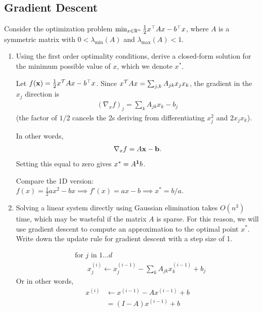 \newpage
\subsection{Gradient Descent}
Consider the optimization problem $\min_{x \in \mathbb{R}^n} \frac{1}{2} x^{\top} Ax - b^{\top}x$, where $A$ is a symmetric matrix with $0 < \lambda_{\min}(A)$ and $\lambda_{\max} (A) < 1$.
\begin{enumerate}[label=(\alph*)]
\item Using the first order optimality conditions, derive a closed-form
  solution for the minimum possible value of $x$, which we denote $x^*$.
  \begin{mdframed}
    Let $f(\mathbf x) = \frac{1}{2} x^\mathcal T Ax - b^{\top}x$. Since
    $x^\mathcal T Ax = \sum_{j,k}A_{jk}x_jx_k$, the gradient in the $x_j$ direction is
    \begin{align*}
      (\nabla_x f)_j = \sum_k A_{jk} x_k - b_j
    \end{align*}
    (the factor of $1/2$ cancels the 2s deriving from differentiating $x_j^2$
    and $2x_jx_k$).

    In other words,
    \begin{align*}
      \nabla_x f = A\mathbf x - \mathbf b.
    \end{align*}
    Setting this equal to zero gives $x^* = A^{\mathbf 1}b$.


    Compare the 1D version:
    $f(x) = \frac{1}{2}ax^2 - bx \implies f'(x) = ax - b \implies x^* = b/a$.
  \end{mdframed}

  \item Solving a linear system directly using Gaussian elimination takes
    $O(n^3)$ time, which may be wasteful if the matrix $A$ is sparse. For this
    reason, we will use gradient descent to compute an approximation to the
    optimal point $x^*$. Write down the update rule for gradient descent with a
    step size of 1.
    \begin{mdframed}
      \begin{align*}
        &\text{for $j$ in $1 \ldots d$}\\
        &~~~~~~~~x^{(i)}_j \leftarrow x^{(i-1)}_j - \sum_k A_{jk} x^{(i-1)}_k + b_j
      \end{align*}
      Or in other words,
      \begin{align*}
        x^{(i)}
        &\leftarrow x^{(i-1)} - A x^{(i-1)} + b \\
        &= (I - A)x^{(i-1)} + b
      \end{align*}


\end{mdframed}
\end{enumerate}
